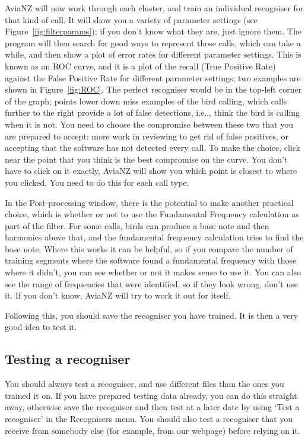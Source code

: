 \documentclass{article}
\begin{document}
AviaNZ will now work through each cluster, and train an individual recogniser for that kind of call. It will show you a variety of parameter settings (see Figure~\ref{fig:filterparams}); if you don't know what they are, just ignore them. The program will then search for good ways to represent those calls, which can take a while, and then show a plot of error rates for different parameter settings. This is known as an ROC curve, and it is a plot of the recall (True Positive Rate) against the False Positive Rate for different parameter settings; two examples are shown in Figure~\ref{fig:ROC}. The perfect recogniser would be in the top-left corner of the graph; points lower down miss examples of the bird calling, which calls further to the right provide a lot of false detections, i.e.., think the bird is calling when it is not. You need to choose the compromise between these two that you are prepared to accept: more work in reviewing to get rid of false positives, or accepting that the software has not detected every call. To make the choice, click near the point that you think is the best compromise on the curve. You don't have to click on it exactly, AviaNZ will show you which point is closest to where you clicked. You need to do this for each call type. 

In the Post-processing window, there is the potential to make another practical choice, which is whether or not to use the Fundamental Frequency calculation as part of the filter. For some calls, birds can produce a base note and then harmonics above that, and the fundamental frequency calculation tries to find the base note. Where this works it can be helpful, so if you compare the number of training segments where the software found a fundamental frequency with those where it didn't, you can see whether or not it makes sense to use it. You can also see the range of frequencies that were identified, so if they look wrong, don't use it. If you don't know, AviaNZ will try to work it out for itself. 

Following this, you should save the recogniser you have trained. It is then a very good idea to test it. 
    
\subsection{Testing a recogniser}\label{sec:testfilter}

You should always test a recogniser, and use different files than the ones you trained it on.
If you have prepared testing data already, you can do this straight away, otherwise save the recogniser and then test at a later date by using `Test a recogniser' in the Recognisers menu. You should also test a recogniser that you receive from somebody else (for example, from our webpage) before relying on it.
\end{document}
